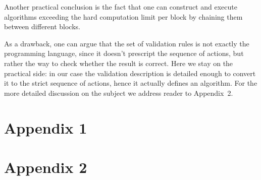 \documentclass[runningheads]{llncs}
\begin{document}
    Another practical conclusion is the fact that one can construct and execute
    algorithms exceeding the hard computation limit per block by chaining them
    between different blocks.

    As a drawback, one can argue that the set of validation rules is not exactly
    the programming language, since it doesn't prescript the sequence of actions,
    but rather the way to check whether the result is correct. Here we stay on the
    practical side: in our case the validation description is detailed enough to
    convert it to the strict sequence of actions, hence it actually defines an
    algorithm. For the more detailed discussion on the subject we address reader
    to Appendix~2.

    

    \section{Appendix 1}


    \section{Appendix 2}

\end{document}
